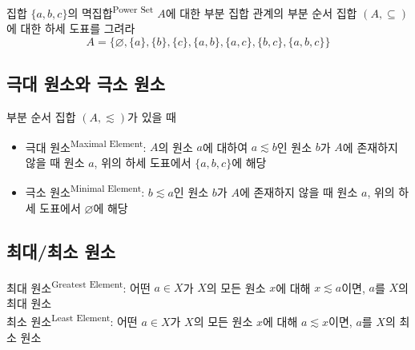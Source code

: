 \pagebreak
집합 $\{a, b, c\}$의 멱집합\textsuperscript{Power Set} $A$에 대한 부분 집합 관계의 부분 순서 집합 $(A, \subseteq)$에 대한 하세 도표를 그려라\\
$$A = \{\varnothing, \{a\}, \{b\}, \{c\}, \{a, b\}, \{a, c\}, \{b, c\}, \{a, b, c\} \}$$
$$$$
\begin{center}
\end{center}

\subsection{극대 원소와 극소 원소}
부분 순서 집합 $(A, \lesssim)$가 있을 때
\begin{itemize}
    \item 극대 원소\textsuperscript{Maximal Element}: $A$의 원소 $a$에 대하여 $a \lesssim b$인 원소 $b$가 $A$에 존재하지 않을 때 원소 $a$, 위의 하세 도표에서 $\{a, b, c\}$에 해당
    \item 극소 원소\textsuperscript{Minimal Element}: $b \lesssim a$인 원소 $b$가 $A$에 존재하지 않을 때 원소 $a$, 위의 하세 도표에서 $\varnothing$에 해당
\end{itemize}

\subsection{최대/최소 원소}
최대 원소\textsuperscript{Greatest Element}: 어떤 $a \in X$가 $X$의 모든 원소 $x$에 대해 $x \lesssim a$이면, $a$를 $X$의 최대 원소\\
최소 원소\textsuperscript{Least Element}: 어떤 $a \in X$가 $X$의 모든 원소 $x$에 대해 $a \lesssim x$이면, $a$를 $X$의 최소 원소

\newpage

